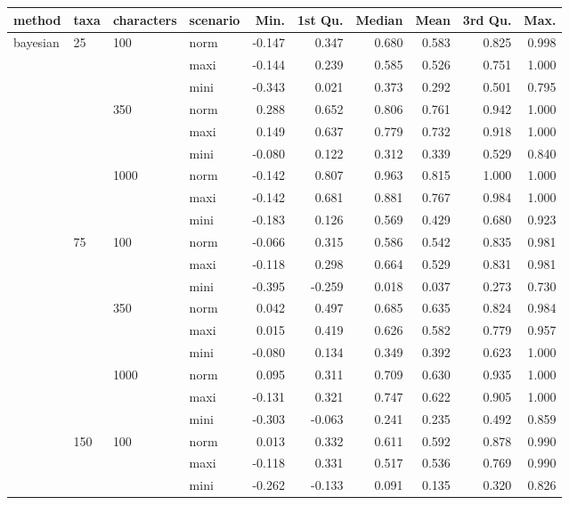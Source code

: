 \begin{longtable}{llllrrrrrr}
  \hline
method & taxa & characters & scenario & Min. & 1st Qu. & Median & Mean & 3rd Qu. & Max. \\ 
  \hline
bayesian & 25 & 100 & norm & -0.147 & 0.347 & 0.680 & 0.583 & 0.825 & 0.998 \\ 
   &  &  & maxi & -0.144 & 0.239 & 0.585 & 0.526 & 0.751 & 1.000 \\ 
   &  &  & mini & -0.343 & 0.021 & 0.373 & 0.292 & 0.501 & 0.795 \\ 
   &  & 350 & norm & 0.288 & 0.652 & 0.806 & 0.761 & 0.942 & 1.000 \\ 
   &  &  & maxi & 0.149 & 0.637 & 0.779 & 0.732 & 0.918 & 1.000 \\ 
   &  &  & mini & -0.080 & 0.122 & 0.312 & 0.339 & 0.529 & 0.840 \\ 
   &  & 1000 & norm & -0.142 & 0.807 & 0.963 & 0.815 & 1.000 & 1.000 \\ 
   &  &  & maxi & -0.142 & 0.681 & 0.881 & 0.767 & 0.984 & 1.000 \\ 
   &  &  & mini & -0.183 & 0.126 & 0.569 & 0.429 & 0.680 & 0.923 \\ 
   & 75 & 100 & norm & -0.066 & 0.315 & 0.586 & 0.542 & 0.835 & 0.981 \\ 
   &  &  & maxi & -0.118 & 0.298 & 0.664 & 0.529 & 0.831 & 0.981 \\ 
   &  &  & mini & -0.395 & -0.259 & 0.018 & 0.037 & 0.273 & 0.730 \\ 
   &  & 350 & norm & 0.042 & 0.497 & 0.685 & 0.635 & 0.824 & 0.984 \\ 
   &  &  & maxi & 0.015 & 0.419 & 0.626 & 0.582 & 0.779 & 0.957 \\ 
   &  &  & mini & -0.080 & 0.134 & 0.349 & 0.392 & 0.623 & 1.000 \\ 
   &  & 1000 & norm & 0.095 & 0.311 & 0.709 & 0.630 & 0.935 & 1.000 \\ 
   &  &  & maxi & -0.131 & 0.321 & 0.747 & 0.622 & 0.905 & 1.000 \\ 
   &  &  & mini & -0.303 & -0.063 & 0.241 & 0.235 & 0.492 & 0.859 \\ 
   & 150 & 100 & norm & 0.013 & 0.332 & 0.611 & 0.592 & 0.878 & 0.990 \\ 
   &  &  & maxi & -0.118 & 0.331 & 0.517 & 0.536 & 0.769 & 0.990 \\ 
   &  &  & mini & -0.262 & -0.133 & 0.091 & 0.135 & 0.320 & 0.826 \\ 

\end{longtable}
